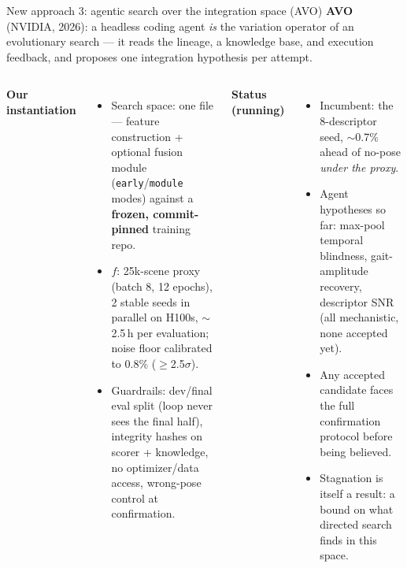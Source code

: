 \documentclass[10pt,aspectratio=169]{beamer}
\begin{document}
\begin{frame}{New approach 3: agentic search over the integration space (AVO)}
\textbf{AVO} (NVIDIA, 2026): a headless coding agent \emph{is} the variation operator of an
evolutionary search --- it reads the lineage, a knowledge base, and execution feedback, and
proposes one integration hypothesis per attempt.
\begin{columns}[T]
\textbf{Our instantiation}
\begin{itemize}\small
  \item Search space: one file --- feature construction + optional fusion module
        (\texttt{early}/\texttt{module} modes) against a \textbf{frozen, commit-pinned} training repo.
  \item $f$: 25k-scene proxy (batch 8, 12 epochs), 2 stable seeds in parallel on H100s,
        $\sim$2.5\,h per evaluation; noise floor calibrated to 0.8\% ($\geq$2.5$\sigma$).
  \item Guardrails: dev/final eval split (loop never sees the final half), integrity
        hashes on scorer + knowledge, no optimizer/data access, wrong-pose control at confirmation.
\end{itemize}
\textbf{Status (running)}
\begin{itemize}\small
  \item Incumbent: the 8-descriptor seed, $\sim$0.7\% ahead of no-pose \emph{under the proxy}.
  \item Agent hypotheses so far: max-pool temporal blindness, gait-amplitude recovery,
        descriptor SNR (all mechanistic, none accepted yet).
  \item Any accepted candidate faces the full confirmation protocol before being believed.
  \item Stagnation is itself a result: a bound on what directed search finds in this space.
\end{itemize}
\end{columns}
\end{frame}
\end{document}
